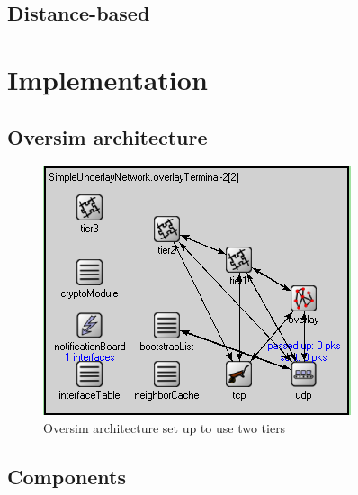 \documentclass[10pt,a4paper,journal,cspaper,compsoc]{IEEEtran}
\begin{document}
\subsection{Distance-based}

\section{Implementation}
\label{implementation}

\subsection{Oversim architecture}

\begin{figure}[htbp]
 \centering
 \includegraphics[width=\columnwidth]{Oversim_arch}
 \caption{Oversim architecture set up to use two tiers}
 \label{fig_oversim_arch}
\end{figure}

\subsection{Components}
\end{document}
